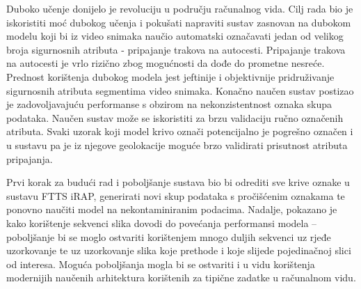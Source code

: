 \documentclass[times, utf8, diplomski, numeric]{fer}
\begin{document}
Duboko učenje donijelo je revoluciju u području računalnog vida. 
Cilj rada bio je iskoristiti moć dubokog učenja i pokušati napraviti sustav zasnovan na dubokom modelu koji bi iz video snimaka naučio automatski označavati jedan od velikog broja sigurnosnih atributa - pripajanje trakova na autocesti.
Pripajanje trakova na autocesti je vrlo rizično zbog mogućnosti da dođe do prometne nesreće.
Prednost korištenja dubokog modela jest jeftinije i objektivnije pridruživanje sigurnosnih atributa segmentima video snimaka. 
Konačno naučen sustav postizao je zadovoljavajuću performanse s obzirom na nekonzistentnost oznaka skupa podataka. 
Naučen sustav može se iskoristiti za brzu validaciju ručno označenih atributa. 
Svaki uzorak koji model krivo označi potencijalno je pogrešno označen i u sustavu pa je iz njegove geolokacije moguće brzo validirati prisutnost atributa pripajanja.

Prvi korak za budući rad i poboljšanje sustava bio bi odrediti sve krive oznake u sustavu FTTS iRAP, generirati novi skup podataka s pročišćenim oznakama te ponovno naučiti model na nekontaminiranim podacima.
Nadalje, pokazano je kako korištenje sekvenci slika dovodi do povećanja performansi modela -- poboljšanje bi se moglo ostvariti korištenjem mnogo duljih sekvenci uz rjeđe uzorkovanje te uz uzorkovanje slika koje prethode i koje slijede pojedinačnoj slici od interesa. 
Moguća poboljšanja mogla bi se ostvariti i u vidu korištenja modernijih naučenih arhitektura korištenih za tipične zadatke u računalnom vidu.



\end{document}
